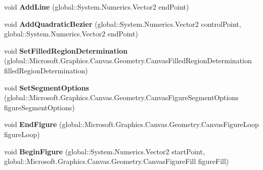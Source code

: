 \begin{DoxyCompactItemize}
void {\bfseries Add\+Line} (global\+::\+System.\+Numerics.\+Vector2 end\+Point)
\item 
\mbox{\label{interface_microsoft_1_1_graphics_1_1_canvas_1_1_geometry_1_1_i_canvas_path_receiver_a782bc874c27fca70636c3657fbd63fb8}} 
void {\bfseries Add\+Quadratic\+Bezier} (global\+::\+System.\+Numerics.\+Vector2 control\+Point, global\+::\+System.\+Numerics.\+Vector2 end\+Point)
\item 
\mbox{\label{interface_microsoft_1_1_graphics_1_1_canvas_1_1_geometry_1_1_i_canvas_path_receiver_a0bcd3e4a427ddf33e3454ce466e35bec}} 
void {\bfseries Set\+Filled\+Region\+Determination} (global\+::\+Microsoft.\+Graphics.\+Canvas.\+Geometry.\+Canvas\+Filled\+Region\+Determination filled\+Region\+Determination)
\item 
\mbox{\label{interface_microsoft_1_1_graphics_1_1_canvas_1_1_geometry_1_1_i_canvas_path_receiver_a5492b54121b4ffc412071f8844a3b6aa}} 
void {\bfseries Set\+Segment\+Options} (global\+::\+Microsoft.\+Graphics.\+Canvas.\+Geometry.\+Canvas\+Figure\+Segment\+Options figure\+Segment\+Options)
\item 
\mbox{\label{interface_microsoft_1_1_graphics_1_1_canvas_1_1_geometry_1_1_i_canvas_path_receiver_acad2c777502ab1ccf0c33ff63873a7c9}} 
void {\bfseries End\+Figure} (global\+::\+Microsoft.\+Graphics.\+Canvas.\+Geometry.\+Canvas\+Figure\+Loop figure\+Loop)
\item 
\mbox{\label{interface_microsoft_1_1_graphics_1_1_canvas_1_1_geometry_1_1_i_canvas_path_receiver_aef7e5c282cbb5cd2800c4626abdf7981}} 
void {\bfseries Begin\+Figure} (global\+::\+System.\+Numerics.\+Vector2 start\+Point, global\+::\+Microsoft.\+Graphics.\+Canvas.\+Geometry.\+Canvas\+Figure\+Fill figure\+Fill)
\item 
\mbox{\label{interface_microsoft_1_1_graphics_1_1_canvas_1_1_geometry_1_1_i_canvas_path_receiver_a50a4758a3ed76ce6c8cd9868b31e29cf}} 

\end{DoxyCompactItemize}
